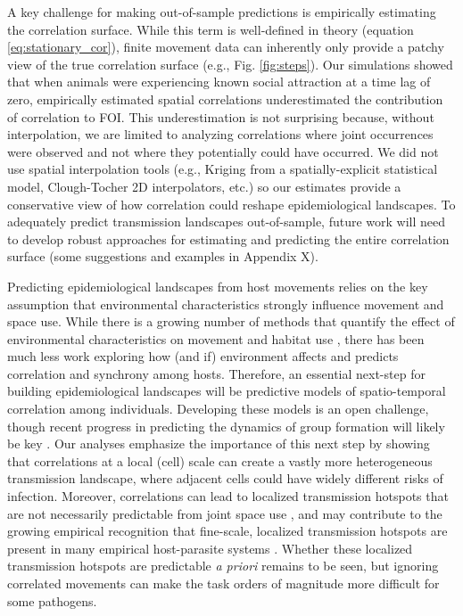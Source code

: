 \documentclass[letterpaper]{article}
\begin{document}
A key challenge for making out-of-sample predictions is empirically estimating the correlation surface.  While this term is well-defined in theory (equation \ref{eq:stationary_cor}), finite movement data can inherently only provide a patchy view of the true correlation surface (e.g., Fig. \ref{fig:steps}).  Our simulations showed that when animals were experiencing known social attraction at a time lag of zero, empirically estimated spatial correlations underestimated the contribution of correlation to FOI. This underestimation is not surprising because, without interpolation, we are limited to analyzing correlations where joint occurrences were observed and not where they potentially could have occurred. We did not use spatial interpolation tools (e.g., Kriging from a spatially-explicit statistical model, Clough-Tocher 2D interpolators, etc.) so our estimates provide a conservative view of how correlation could reshape epidemiological landscapes.  To adequately predict transmission landscapes out-of-sample, future work will need to develop robust approaches for estimating and predicting the entire correlation surface (some suggestions and examples in Appendix X). 

Predicting epidemiological landscapes from host movements relies on the key assumption that environmental characteristics strongly influence movement and space use. While there is a growing number of methods that quantify the effect of environmental characteristics on movement and habitat use \citep[reviewed in][]{Hooten2017a}, there has been much less work exploring how (and if) environment affects and predicts correlation and synchrony among hosts.  Therefore, an essential next-step for building epidemiological landscapes will be predictive models of spatio-temporal correlation among individuals.  Developing these models is an open challenge, though recent progress in predicting the dynamics of group formation will likely be key \citep[e.g.][]{Brandell2021}.
Our analyses emphasize the importance of this next step by showing that correlations at a local (cell) scale can create a vastly more heterogeneous transmission landscape, where adjacent cells could have widely different risks of infection.  Moreover, correlations can lead to localized transmission hotspots that are not necessarily predictable from joint space use \citep{Yang2023a}, and may contribute to the growing empirical recognition that fine-scale, localized transmission hotspots are present in many empirical host-parasite systems \citep{Albery2021}.  Whether these localized transmission hotspots are predictable \emph{a priori} remains to be seen, but ignoring correlated movements can make the task orders of magnitude more difficult for some pathogens.
\end{document}
